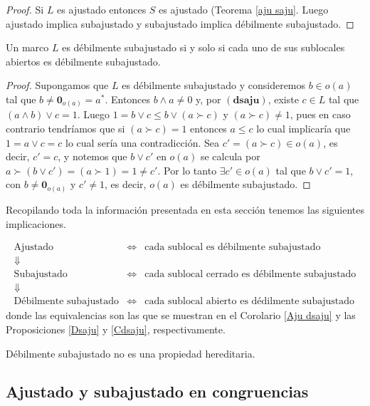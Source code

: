 \begin{proof}
    Si $L$ es ajustado entonces $S$ es ajustado (Teorema \ref{aju saju}. Luego ajustado implica subajustado y subajustado implica débilmente subajustado.
\end{proof}

\begin{prop}\label{Cdsaju}
    Un marco $L$ es débilmente subajustado si y solo si  cada uno de sus sublocales abiertos es débilmente subajustado.
\end{prop}

\begin{proof}
    Supongamos que $L$ es débilmente subajustado y consideremos $b\in o(a)$ tal que $b\neq \mathbf{0}_{o(a)}=a^*$. Entonces $b\wedge a\neq 0$ y, por $(\mathbf{dsaju})$, existe $c\in L$ tal que $(a\wedge b)\vee c=1$. Luego $1=b\vee c\leq b\vee (a\succ c)$ y $(a\succ c)\neq 1$, pues en caso contrario tendríamos que si $(a\succ c)=1$ entonces $a\leq c$ lo cual implicaría que $1=a\vee c=c$ lo cual sería una contradicción. Sea $c'=(a\succ c)\in o(a)$, es decir, $c'=c$, y notemos que $b\vee c'$ en $o(a)$ se calcula por $a\succ (b\vee c')=(a\succ 1)=1\neq c'$. Por lo tanto $\exists c'\in o(a)$ tal que $b\vee c'=1$, con $b\neq \mathbf{0}_{o(a)}$ y $c'\neq 1$, es decir, $o(a)$ es débilmente subajustado.
\end{proof}

Recopilando toda la información presentada en esta sección tenemos las siguientes implicaciones.

\[
\begin{array}{ccl}
   \mbox{Ajustado}  & \Longleftrightarrow & \mbox{cada sublocal es débilmente subajustado}  \\
    \Downarrow &  & \\
   \mbox{Subajustado}  & \Longleftrightarrow & \mbox{cada sublocal cerrado es débilmente subajustado}  \\
    \Downarrow &  & \\
   \mbox{Débilmente subajustado}  & \Longleftrightarrow & \mbox{cada sublocal abierto es dédilmente subajustado}  
\end{array}
\]
donde las equivalencias son las que se muestran en el Corolario \ref{Aju dsaju} y las Proposiciones \ref{Dsaju} y \ref{Cdsaju}, respectivamente.

\begin{cor}
    Débilmente subajustado no es una propiedad hereditaria.
\end{cor}


\subsection{Ajustado y subajustado en congruencias}


